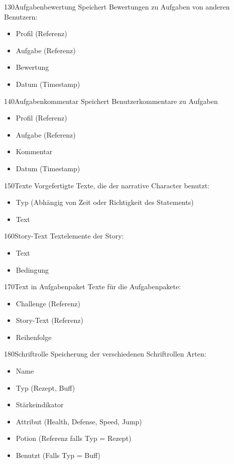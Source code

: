 \begin{data}{130}{Aufgabenbewertung}
	Speichert Bewertungen zu Aufgaben von anderen Benutzern:
	\begin{itemize}
		\item Profil (Referenz)
		\item Aufgabe (Referenz)
		\item Bewertung
		\item Datum (Timestamp)
	\end{itemize}
\end{data}

\begin{data}{140}{Aufgabenkommentar}
	Speichert Benutzerkommentare zu Aufgaben
	\begin{itemize}
		\item Profil (Referenz)
		\item Aufgabe (Referenz)
		\item Kommentar
		\item Datum (Timestamp)
	\end{itemize}
\end{data}

\begin{data}{150}{Texte}
	Vorgefertigte Texte, die der narrative Character benutzt:
	\begin{itemize}
		\item Typ (Abhängig von Zeit oder Richtigkeit des Statements)
		\item Text
	\end{itemize}
\end{data}

\begin{data}{160}{Story-Text}
	Textelemente der Story:
	\begin{itemize}
		\item Text
		\item Bedingung
	\end{itemize}
\end{data}

\begin{data}{170}{Text in Aufgabenpaket}
	Texte für die Aufgabenpakete:
	\begin{itemize}
		\item Challenge (Referenz)
		\item Story-Text (Referenz)
		\item Reihenfolge
	\end{itemize}
\end{data}


\begin{data}{180}{Schriftrolle}
	Speicherung der verschiedenen Schriftrollen Arten:
	\begin{itemize}
		\item Name
		\item Typ (Rezept, Buff)
		\item Stärkeindikator 
		\item Attribut (Health, Defense, Speed, Jump)
		\item Potion (Referenz falls Typ = Rezept)
		\item Benutzt (Falls Typ = Buff)
	\end{itemize}
\end{data}

